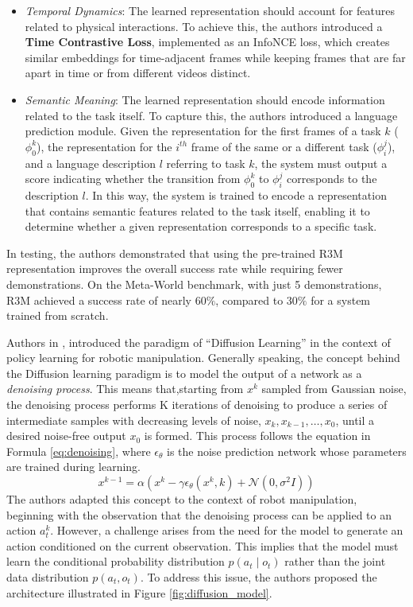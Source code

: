 \begin{itemize}
    \item \textit{Temporal Dynamics}: The learned representation should account for features related to physical interactions. To achieve this, the authors introduced a \textbf{Time Contrastive Loss}, implemented as an InfoNCE loss, which creates similar embeddings for time-adjacent frames while keeping frames that are far apart in time or from different videos distinct.
    \item \textit{Semantic Meaning}: The learned representation should encode information related to the task itself. To capture this, the authors introduced a language prediction module. Given the representation for the first frames of a task $k$ ($\phi^{k}_{0}$), the representation for the $i^{th}$ frame of the same or a different task ($\phi^{j}_{i}$), and a language description $l$ referring to task $k$, the system must output a score indicating whether the transition from $\phi^{k}_{0}$ to $\phi^{j}_{i}$ corresponds to the description $l$. In this way, the system is trained to encode a representation that contains semantic features related to the task itself, enabling it to determine whether a given representation corresponds to a specific task.
\end{itemize}

In testing, the authors demonstrated that using the pre-trained R3M representation improves the overall success rate while requiring fewer demonstrations. On the Meta-World benchmark, with just 5 demonstrations, R3M achieved a success rate of nearly $60\%$, compared to $30\%$ for a system trained from scratch.


Authors in \cite{cheng2023diffusion}, introduced the paradigm of ``Diffusion Learning'' in the context of policy learning for robotic manipulation. Generally speaking, the concept behind the Diffusion learning paradigm is to model the output of a network as a \textit{denoising process}. This means that,starting from $x^k$ sampled from Gaussian noise, the denoising process performs K iterations of denoising to produce a series of intermediate samples with decreasing levels of noise, $x_k, x_{k-1}, \dots, x_0$, until a desired noise-free output $x_0$ is formed. This process follows the equation in Formula \ref{eq:denoising}, where $\epsilon_{\theta}$ is the noise prediction network whose parameters are trained during learning.
\begin{equation}
    \label{eq:denoising}
    x^{k-1} = \alpha \left( x^k - \gamma \epsilon_{\theta}(x^k, k) + \mathcal{N}(0, \sigma^{2}I)\right)
\end{equation}
The authors adapted this concept to the context of robot manipulation, beginning with the observation that the denoising process can be applied to an action $a_{t}^{k}$. However, a challenge arises from the need for the model to generate an action conditioned on the current observation. This implies that the model must learn the conditional probability distribution $p(a_t \mid o_t)$ rather than the joint data distribution $p(a_t, o_t)$. To address this issue, the authors proposed the architecture illustrated in Figure \ref{fig:diffusion_model}.

